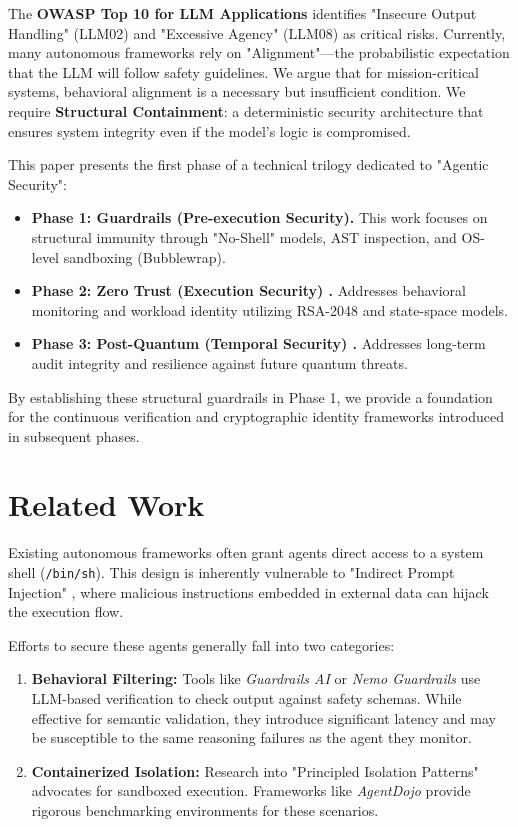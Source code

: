 \documentclass[conference]{IEEEtran}
\begin{document}
The \textbf{OWASP Top 10 for LLM Applications} \cite{owasp2023} identifies "Insecure Output Handling" (LLM02) and "Excessive Agency" (LLM08) as critical risks. Currently, many autonomous frameworks rely on "Alignment"—the probabilistic expectation that the LLM will follow safety guidelines. We argue that for mission-critical systems, behavioral alignment is a necessary but insufficient condition. We require \textbf{Structural Containment}: a deterministic security architecture that ensures system integrity even if the model's logic is compromised.

This paper presents the first phase of a technical trilogy dedicated to "Agentic Security":
\begin{itemize}
    \item \textbf{Phase 1: Guardrails (Pre-execution Security).} This work focuses on structural immunity through "No-Shell" models, AST inspection, and OS-level sandboxing (Bubblewrap).
    \item \textbf{Phase 2: Zero Trust (Execution Security) \cite{ando2026zerotrust}.} Addresses behavioral monitoring and workload identity utilizing RSA-2048 and state-space models.
    \item \textbf{Phase 3: Post-Quantum (Temporal Security) \cite{ando2026pqc}.} Addresses long-term audit integrity and resilience against future quantum threats.
\end{itemize}

By establishing these structural guardrails in Phase 1, we provide a foundation for the continuous verification and cryptographic identity frameworks introduced in subsequent phases.

\section{Related Work}
Existing autonomous frameworks often grant agents direct access to a system shell (\texttt{/bin/sh}). This design is inherently vulnerable to "Indirect Prompt Injection" \cite{greshake2023not}, where malicious instructions embedded in external data can hijack the execution flow. 

Efforts to secure these agents generally fall into two categories:
\begin{enumerate}
    \item \textbf{Behavioral Filtering:} Tools like \textit{Guardrails AI} or \textit{Nemo Guardrails} use LLM-based verification to check output against safety schemas. While effective for semantic validation, they introduce significant latency and may be susceptible to the same reasoning failures as the agent they monitor.
    \item \textbf{Containerized Isolation:} Research into "Principled Isolation Patterns" \cite{masood2024sandboxed} advocates for sandboxed execution. Frameworks like \textit{AgentDojo} \cite{agentdojo2024} provide rigorous benchmarking environments for these scenarios.
\end{enumerate}
\end{document}
